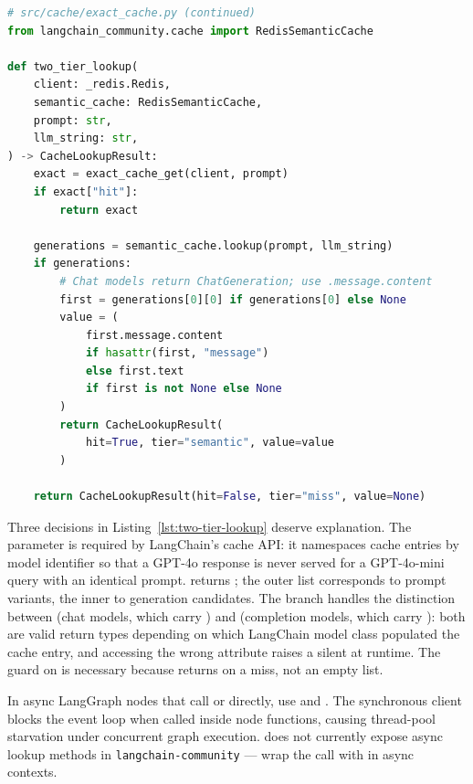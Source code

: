 \begin{lstlisting}[language=Python,
  caption={Two-tier lookup: exact then semantic, unified return type},
  label={lst:two-tier-lookup}]
# src/cache/exact_cache.py (continued)
from langchain_community.cache import RedisSemanticCache

def two_tier_lookup(
    client: _redis.Redis,
    semantic_cache: RedisSemanticCache,
    prompt: str,
    llm_string: str,
) -> CacheLookupResult:
    exact = exact_cache_get(client, prompt)
    if exact["hit"]:
        return exact

    generations = semantic_cache.lookup(prompt, llm_string)
    if generations:
        # Chat models return ChatGeneration; use .message.content
        first = generations[0][0] if generations[0] else None
        value = (
            first.message.content
            if hasattr(first, "message")
            else first.text
            if first is not None else None
        )
        return CacheLookupResult(
            hit=True, tier="semantic", value=value
        )

    return CacheLookupResult(hit=False, tier="miss", value=None)
\end{lstlisting}

Three decisions in Listing~\ref{lst:two-tier-lookup} deserve explanation.
The  parameter is required by LangChain's cache API:
it namespaces cache entries by model identifier so that a GPT-4o response
is never served for a GPT-4o-mini query with an identical prompt.
 returns ; the outer list corresponds to prompt variants, the inner to
generation candidates. The  branch
handles the distinction between  (chat models, which
carry ) and  (completion models,
which carry ): both are valid return types depending on which
LangChain model class populated the cache entry, and accessing the wrong
attribute raises a silent  at runtime. The
 guard on  is necessary because
 returns  on a miss, not an empty list.

\begin{warningbox}
In async LangGraph nodes that call  or
 directly, use  and
. The synchronous  client
blocks the event loop when called inside  node functions,
causing thread-pool starvation under concurrent graph execution.
 does not currently expose async lookup methods
in \texttt{langchain-community} --- wrap the 
call with  in async contexts.
\end{warningbox}

